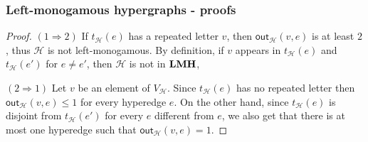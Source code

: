 \documentclass[3p]{elsarticle}
\newcommand{\outd}[1]{\mathsf{out}_{\mathcal{#1}}}
\newcommand{\catname}[1]{\textbf{\textup{#1}}}
\newcommand{\lmo}{\catname{LMH}}
\theoremstyle{remark}
\theoremstyle{definition}
\begin{document}
\subsubsection{Left-monogamous hypergraphs - proofs}

\elem*
\begin{proof}\label{proof:elem}
	$(1\Rightarrow 2)$ If $t_{\mathcal{H}}(e)$ has a repeated letter $v$, then $\outd{H}(v,e)$ is at least $2$, thus $\mathcal{H}$ is not left-monogamous.  By definition, if $v$ appears in $t_{\mathcal{H}}(e)$ and $t_{\mathcal{H}}(e')$ for $e\neq e'$, then $\mathcal{H}$ is not in $\lmo$,
	\smallskip \noindent 	
	
	$(2\Rightarrow 1)$ Let $v$ be an element of $V_{\mathcal{H}}$. Since $t_{\mathcal{H}}(e)$ has no repeated letter then $\outd{H}(v,e)\leq 1$ for every hyperedge $e$. On the other hand, since $t_{\mathcal{H}}(e)$ is disjoint from $t_{\mathcal{H}}(e')$ for every $e$ different from $e$, we also get that there is at most one hyperedge such that  $\outd{H}(v,e) = 1$.
\end{proof}
\end{document}
